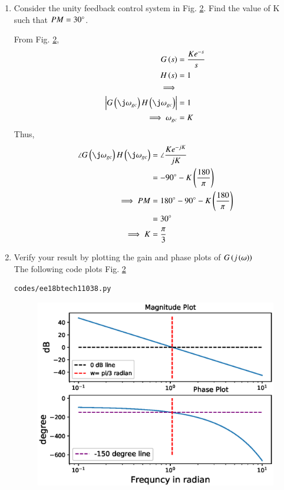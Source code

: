 \begin{enumerate}[label=\thesubsection.\arabic*.,ref=\thesubsection.\theenumi]

\item
Consider the unity feedback control system in Fig.  \ref{fig:ee18btech11038}. Find the value of K such that $PM = 30\degree$.

\begin{figure}[!ht]
	\begin{center}
		
		\resizebox{\columnwidth}{!}{}
	\end{center}
\caption{}
\label{fig:ee18btech11038}
\end{figure}
\solution From Fig. \ref{fig:ee18btech11038},
%
\begin{align}
G\brak{s} &= \frac{Ke^{-s}}{s}
\\
H\brak{s} &= 1
\\
\implies 
%
\\
\abs{G\brak{\j\omega_{gc}}H\brak{\j\omega_{gc}}} &= 1
\\
\implies \omega_{gc} &= K  
\end{align}
%
Thus, 
\begin{align}
\label{eq:PM_in_K}
\angle G\brak{\j\omega_{gc}}H\brak{\j\omega_{gc}} &=
 \angle \frac{{Ke^{-jK}}}{jK} 
\\
&= -90\degree - K\brak{\frac{180}{\pi}}
\\
\implies
    PM &= 180\degree -90\degree - K\brak{\frac{180}{\pi}}
\\
 &= 30\degree
    \\
\implies    K&= \frac{\pi}{3}
\end{align}
\item Verify your result by plotting the gain and phase plots of $G\left(j\left(\omega\right)\right)$ 
\\
\solution The following code plots Fig. \ref{fig:ee18btech11038}

\begin{lstlisting}
codes/ee18btech11038.py
\end{lstlisting}
\begin{figure}[!h]
  \includegraphics[width=\columnwidth]{./figs/ee18btech11038/ee18btech11038.eps}
  \caption{}
  \label{fig:ee18btech11038}
\end{figure}

\end{enumerate}
